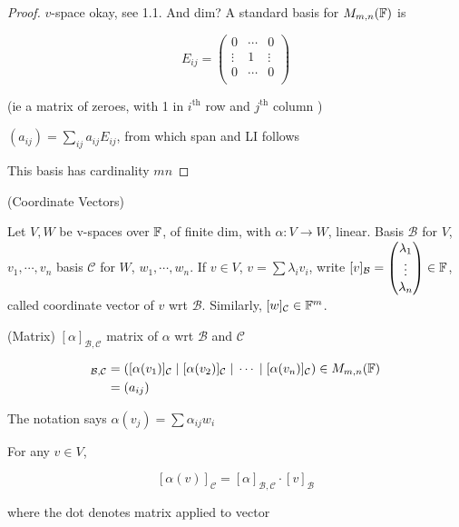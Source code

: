 \documentclass[a4paper]{article}
\begin{document}
\begin{proof}
	$ v $-space okay, see 1.1. And dim? A standard basis for $ M_{m,n}(\mathbb{F}) $ is 
	
	\[ E_{ij} =  \begin{pmatrix}
	0 & \cdots & 0 \\
	\vdots & 1 &  \vdots\\
	0 & \cdots & 0\\


	\end{pmatrix} \]
	
	(ie a matrix of zeroes, with 1 in $ i^{\text{th}}  $ row and $ j^{\text{th}}$ column )
	
	
	$ (a_{ij}) = \sum_{ij}  a_{ij} E_{ij} $, from which span and LI follows
	
	This basis has cardinality $ mn $
	
\end{proof}


\begin{defi} (Coordinate Vectors)
	
	Let $ V,W $ be v-spaces over $ \mathbb{F} $, of finite dim, with $ \alpha : V \to W $, linear. Basis $ \mathcal{B} $ for $ V $, $ v_{1},\cdots,v_{n} $ basis $ \mathcal{C} $ for $ W $, $ w_{1},\cdots,w_{n} $. If $  v \in V $, $ v = \sum \lambda_{i} v_{i} $, write $ [v]_{\mathcal{B}} = \begin{pmatrix}
\lambda_{1} \\
\vdots \\
\lambda_{n}
\end{pmatrix} \in \mathbb{F}$, called coordinate vector of $ v $ wrt $ \mathcal{B} $. Similarly, $ [w]_{\mathcal{C}} \in \mathbb{F}^{m} $.
\end{defi}

\begin{defi} (Matrix)
	$ [\alpha]_{\mathcal{B},\mathcal{C}} $ matrix of $ \alpha $ wrt $ \mathcal{B} $ and $ \mathcal{C} $
	
	
	\begin{align*}
	[\alpha]_{\mathcal{B},\mathcal{C}} & = \left(   [\alpha(v_{1})]_{\mathcal{C}} \; | \; [\alpha(v_{2})]_{\mathcal{C}} \; | \; \cdots \; | \; [\alpha(v_{n})]_{\mathcal{C}} \right) \in M_{m,n}(\F)  \\
	& = (a_{ij})
	\end{align*}
\end{defi}

The notation says $ \alpha(v_{j}) = \sum \alpha_{ij} w_{i} $

\begin{lemma} For any $ v \in V $, 
	
	\[ [\alpha(v)]_{\mathcal{C}} = [\alpha]_{\mathcal{B},\mathcal{C}} \cdot [v]_{\mathcal{B}} \]
	
	where the dot denotes matrix applied to vector
	
\end{lemma}
\end{document}
